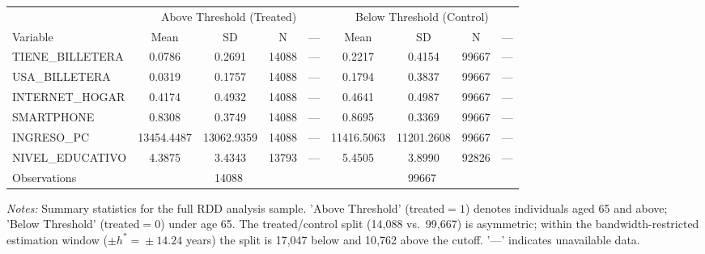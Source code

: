 \begin{threeparttable}
\begin{tabular}{l cccc cccc}
\toprule
& \multicolumn{4}{c}{Above Threshold (Treated)} & \multicolumn{4}{c}{Below Threshold (Control)} \\
\cmidrule(lr){2-5} \cmidrule(lr){6-9}
Variable & Mean & SD & N & --- & Mean & SD & N & --- \\
\midrule
  TIENE\_BILLETERA & 0.0786 & 0.2691 & 14088 & --- & 0.2217 & 0.4154 & 99667 & --- \\
  USA\_BILLETERA & 0.0319 & 0.1757 & 14088 & --- & 0.1794 & 0.3837 & 99667 & --- \\
  INTERNET\_HOGAR & 0.4174 & 0.4932 & 14088 & --- & 0.4641 & 0.4987 & 99667 & --- \\
  SMARTPHONE & 0.8308 & 0.3749 & 14088 & --- & 0.8695 & 0.3369 & 99667 & --- \\
  INGRESO\_PC & 13454.4487 & 13062.9359 & 14088 & --- & 11416.5063 & 11201.2608 & 99667 & --- \\
  NIVEL\_EDUCATIVO & 4.3875 & 3.4343 & 13793 & --- & 5.4505 & 3.8990 & 92826 & --- \\
\midrule
  Observations & \multicolumn{4}{c}{14088} & \multicolumn{4}{c}{99667} \\
\bottomrule
\end{tabular}
\begin{tablenotes}
\small
\item \textit{Notes:} Summary statistics for the full RDD analysis sample. 'Above Threshold' (treated$=1$) denotes individuals aged 65 and above; 'Below Threshold' (treated$=0$) under age 65. The treated/control split (14{,}088 vs.\ 99{,}667) is asymmetric; within the bandwidth-restricted estimation window ($\pm h^{\ast}\!=\!\pm 14.24$ years) the split is 17{,}047 below and 10{,}762 above the cutoff. '---' indicates unavailable data.
\end{tablenotes}
\end{threeparttable}